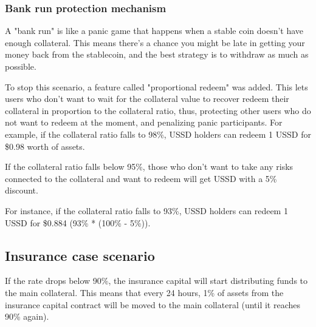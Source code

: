 \subsubsection{Bank run protection mechanism}

A "bank run" is like a panic game that happens when a stable coin doesn't have enough collateral. This means there's a chance you might be late in getting your money back from the stablecoin, and the best strategy is to withdraw as much as possible.

To stop this scenario, a feature called "proportional redeem" was added. This lets users who don't want to wait for the collateral value to recover redeem their collateral in proportion to the collateral ratio, thus, protecting other users who do not want to redeem at the moment, and penalizing panic participants.
For example, if the collateral ratio falls to 98\%, USSD holders can redeem 1 USSD for \$0.98 worth of assets.

If the collateral ratio falls below 95\%, those who don't want to take any risks connected to the collateral and want to redeem will get USSD with a 5\% discount.

For instance, if the collateral ratio falls to 93\%, USSD holders can redeem 1 USSD for \$0.884 (93\% * (100\% - 5\%)).

\subsection{Insurance case scenario}

If the rate drops below 90\%, the insurance capital will start distributing funds to the main collateral. This means that every 24 hours, 1\% of assets from the insurance capital contract will be moved to the main collateral (until it reaches 90\% again).

